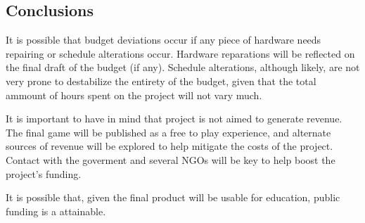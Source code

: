 \subsection{Conclusions}

It is possible that budget deviations occur if any piece of hardware needs repairing or schedule alterations occur. Hardware reparations will be reflected on the final draft of the budget (if any). Schedule alterations, although likely, are not very prone to destabilize the entirety of the budget, given that the total ammount of hours spent on the project will not vary much.  

It is important to have in mind that project is not aimed to generate revenue. The final game will be published as a free to play experience, and alternate sources of revenue will be explored to help mitigate the costs of the project. Contact with the goverment and several \glspl{NGO} will be key to help boost the project's funding.

It is possible that, given the final product will be usable for education, public funding is a attainable.
